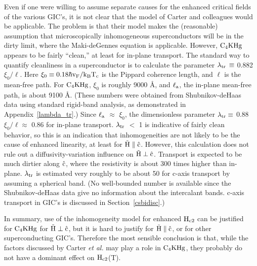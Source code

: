         Even if one were willing to assume separate causes for the enhanced
critical fields  of the  various GIC's, it is not  clear that the  model of
Carter and colleagues would be applicable.  The problem is that their model
makes the (reasonable)  assumption   that   microscopically   inhomogeneous
superconductors  will be   in  the dirty  limit,  where  the  Maki-deGennes
equation is   applicable.   However,  $\rm  C_4KHg$  appears  to  be fairly
``clean,'' at  least for in-plane transport.  The  standard way to quantify
cleanliness in   a  superconductor  is  to calculate   the  parameter  $\rm
\lambda_{tr}  \, \equiv$   0.882 $\xi_0 / \ell$.\cite{helfand66}  Here $\rm
\xi_0 \equiv 0.18 \hbar v_F/ k_B T_c$  is the Pippard  coherence length, and
$\ell$ is  the mean-free path.  For $\rm  C_4KHg$, $\xi_0$ is roughly  9000
\AA, and $\rm
\ell_a$, the in-plane  mean-free path, is about 9100 \AA.  (These  numbers
were  obtained   from   Shubnikov-deHaas  data\cite{W179}   using  standard
rigid-band analysis,  as demonstrated  in Appendix~\ref{lambda_tr}.)  Since
$\rm   \ell_a$ $\approx$   $\xi_0$,   the    dimensionless  parameter  $\rm \lambda_{tr} \equiv$ 0.88 $\xi_0/\ell
\approx$  0.86 for in-plane transport.   $\rm \lambda_{tr}$ $<$ 1 is
indicative  of fairly   clean  behavior,\cite{helfand66}   so this  is   an
indication that inhomogeneities are not likely to be the cause  of enhanced
linearity, at least for $\rm
\vec{H}  \parallel  \hat{c}$.    However,    this calculation   does   not  rule   out   a
diffusivity-variation influence on $\rm  \vec{H} \perp \hat{c}$.  Transport
is expected to be much dirtier along $\rm  \hat{c}$,  where the resistivity
is about 300 times higher than in-plane.\cite{fischer83} $\rm
\lambda_{tr}$ is estimated very roughly to be about 50 for c-axis transport
by assuming a spherical band.  (No well-bounded  number  is available since
the   Shubnikov-deHaas  data   give no information   about  the intercalant
bands.\cite{W179}  c-axis transport   in    GIC's     is  discussed      in
Section~\ref{csbidisc}.)

        In summary, use   of   the inhomogeneity  model  for enhanced  $\rm
H_{c2}$ can be justified for $\rm C_4KHg$  for $\rm \vec{H} \perp \hat{c}$,
but it is hard to justify for $\rm \vec{H} \parallel \hat{c}$, or for other
superconducting GIC's.   Therefore   the most sensible   conclusion is that,
while the factors  discussed by Carter {\em  et al.\/} may play a  role  in
$\rm  C_4KHg$, they  probably  do  not   have a   dominant effect  on  $\rm
H_{c2}$(T).

